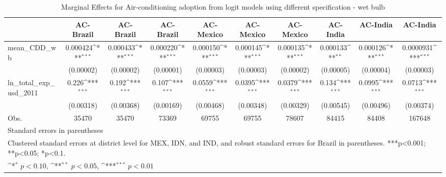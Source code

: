 \begin{table}[htbp]\centering
\def\sym#1{\ifmmode^{#1}\else\(^{#1}\)\fi}
\caption{Marginal Effects for Air-conditioning adoption from logit models using different specification - wet bulb}
\begin{tabular}{l*{9}{c}}
\hline\hline
            &\multicolumn{1}{c}{AC-Brazil}&\multicolumn{1}{c}{AC-Brazil}&\multicolumn{1}{c}{AC-Brazil}&\multicolumn{1}{c}{AC-Mexico}&\multicolumn{1}{c}{AC-Mexico}&\multicolumn{1}{c}{AC-Mexico}&\multicolumn{1}{c}{AC-India}&\multicolumn{1}{c}{AC-India}&\multicolumn{1}{c}{AC-India}\\
\hline
mean\_CDD\_wb &    0.000424\sym{***}&    0.000433\sym{***}&    0.000220\sym{***}&    0.000150\sym{***}&    0.000145\sym{***}&    0.000135\sym{***}&    0.000133\sym{**} &    0.000126\sym{***}&   0.0000931\sym{***}\\
            &   (0.00002)         &   (0.00002)         &   (0.00001)         &   (0.00003)         &   (0.00003)         &   (0.00002)         &   (0.00005)         &   (0.00004)         &   (0.00003)         \\
ln\_total\_exp\_usd\_2011&       0.226\sym{***}&       0.192\sym{***}&       0.107\sym{***}&      0.0559\sym{***}&      0.0395\sym{***}&      0.0379\sym{***}&       0.134\sym{***}&      0.0995\sym{***}&      0.0713\sym{***}\\
            &   (0.00318)         &   (0.00368)         &   (0.00169)         &   (0.00468)         &   (0.00348)         &   (0.00329)         &   (0.00545)         &   (0.00496)         &   (0.00374)         \\
\hline
Obs.        &       35470         &       35470         &       73369         &       69755         &       69755         &       78607         &       84415         &       84408         &      167648         \\
\hline\hline
\multicolumn{10}{l}{\footnotesize Standard errors in parentheses}\\
\multicolumn{10}{l}{\footnotesize Clustered standard errors at district level for MEX, IDN, and IND, and robust standard errors for Brazil in parentheses. ***p<0.001; **p<0.05; *p<0.1.}\\
\multicolumn{10}{l}{\footnotesize \sym{*} \(p<0.10\), \sym{**} \(p<0.05\), \sym{***} \(p<0.01\)}\\
\end{tabular}
\end{table}

